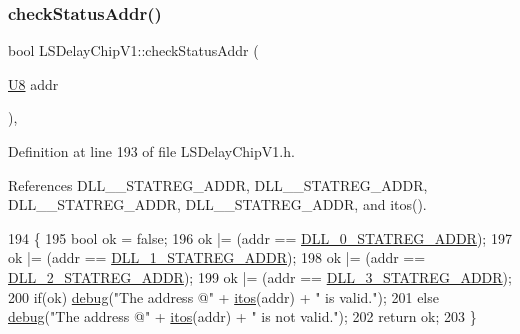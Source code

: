 \subsubsection{\texorpdfstring{check\+Status\+Addr()}{checkStatusAddr()}}
{\footnotesize\ttfamily bool L\+S\+Delay\+Chip\+V1\+::check\+Status\+Addr (\begin{DoxyParamCaption}\item[{\hyperlink{ICECALv3_8h_a3cb25ca6f51f003950f9625ff05536fc}{U8}}]{addr }\end{DoxyParamCaption})\hspace{0.3cm}{\ttfamily [inline]}, {\ttfamily [private]}}



Definition at line 193 of file L\+S\+Delay\+Chip\+V1.\+h.



References D\+L\+L\+\_\+\_\+\+S\+T\+A\+T\+R\+E\+G\+\_\+\+A\+D\+DR, D\+L\+L\+\_\+\_\+\+S\+T\+A\+T\+R\+E\+G\+\_\+\+A\+D\+DR, D\+L\+L\+\_\+\_\+\+S\+T\+A\+T\+R\+E\+G\+\_\+\+A\+D\+DR, D\+L\+L\+\_\+\_\+\+S\+T\+A\+T\+R\+E\+G\+\_\+\+A\+D\+DR, and itos().


\begin{DoxyCode}
194     \{
195          \textcolor{keywordtype}{bool} ok = \textcolor{keyword}{false};  
196          ok |= (addr == \hyperlink{LSDelayChipV1_8h_adca5cc0cd52b4fe9328f3471b0b9c613}{DLL\_0\_STATREG\_ADDR}); 
197          ok |= (addr == \hyperlink{LSDelayChipV1_8h_a39e2f4a0151fcdf29a28e917154fa039}{DLL\_1\_STATREG\_ADDR});
198          ok |= (addr == \hyperlink{LSDelayChipV1_8h_a11ad4f0e8a466fc2da33308f351b9054}{DLL\_2\_STATREG\_ADDR});
199          ok |= (addr == \hyperlink{LSDelayChipV1_8h_ad23a65fd56cf8a5ba711228025ab5e48}{DLL\_3\_STATREG\_ADDR});  
200          \textcolor{keywordflow}{if}(ok) \hyperlink{classObject_aac010553f022165573714b7014a15f0d}{debug}(\textcolor{stringliteral}{"The address @"} + \hyperlink{Tools_8h_af330027dbdafb9a30768b3613c553e60}{itos}(addr) + \textcolor{stringliteral}{" is valid."});
201          \textcolor{keywordflow}{else}   \hyperlink{classObject_aac010553f022165573714b7014a15f0d}{debug}(\textcolor{stringliteral}{"The address @"} + \hyperlink{Tools_8h_af330027dbdafb9a30768b3613c553e60}{itos}(addr) + \textcolor{stringliteral}{" is not valid."});         
202          \textcolor{keywordflow}{return} ok;           
203     \}
\end{DoxyCode}
\mbox{\label{classLSDelayChipV1_a97a50092ce40f6322db946fc580f7230}} 
